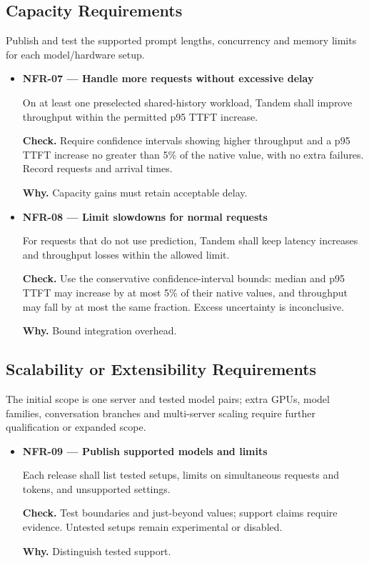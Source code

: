 \documentclass[12pt]{article}
\begin{document}
\subsection{Capacity Requirements}
Publish and test the supported prompt lengths, concurrency and memory limits for each model/hardware setup.

\begin{itemize}
\item {}\label{req:NFR-07}
\textbf{NFR-07 --- Handle more requests without excessive delay}\par
On at least one preselected shared-history workload, Tandem shall improve throughput within the permitted p95 TTFT increase.\par
\textbf{Check.} Require confidence intervals showing higher throughput and a p95 TTFT increase no greater than 5\% of the native value, with no extra failures. Record requests and arrival times.\par
\textbf{Why.} Capacity gains must retain acceptable delay.


\item {}\label{req:NFR-08}
\textbf{NFR-08 --- Limit slowdowns for normal requests}\par
For requests that do not use prediction, Tandem shall keep latency increases and throughput losses within the allowed limit.\par
\textbf{Check.} Use the conservative confidence-interval bounds: median and p95 TTFT may increase by at most 5\% of their native values, and throughput may fall by at most the same fraction. Excess uncertainty is inconclusive.\par
\textbf{Why.} Bound integration overhead.
\end{itemize}

\subsection{Scalability or Extensibility Requirements}
The initial scope is one server and tested model pairs; extra GPUs, model families, conversation branches and multi-server scaling require further qualification or expanded scope.

\begin{itemize}
\item {}\label{req:NFR-09}
\textbf{NFR-09 --- Publish supported models and limits}\par
Each release shall list tested setups, limits on simultaneous requests and tokens, and unsupported settings.\par
\textbf{Check.} Test boundaries and just-beyond values; support claims require evidence. Untested setups remain experimental or disabled.\par
\textbf{Why.} Distinguish tested support.
\end{itemize}
\end{document}
